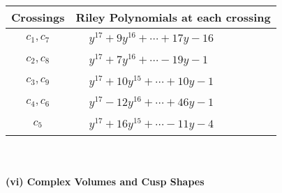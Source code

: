 \documentclass[1p]{elsarticle_modified}
\theoremstyle{definition}
\begin{document}
\begin{tabular}{m{50pt}|m{274pt}}
Crossings & \hspace{64pt}Riley Polynomials at each crossing \\
\hline $$\begin{aligned}c_{1},c_{7}\end{aligned}$$&$\begin{aligned}
&y^{17}+9 y^{16}+\cdots+17 y-16
\end{aligned}$\\
\hline $$\begin{aligned}c_{2},c_{8}\end{aligned}$$&$\begin{aligned}
&y^{17}+7 y^{16}+\cdots-19 y-1
\end{aligned}$\\
\hline $$\begin{aligned}c_{3},c_{9}\end{aligned}$$&$\begin{aligned}
&y^{17}+10 y^{15}+\cdots+10 y-1
\end{aligned}$\\
\hline $$\begin{aligned}c_{4},c_{6}\end{aligned}$$&$\begin{aligned}
&y^{17}-12 y^{16}+\cdots+46 y-1
\end{aligned}$\\
\hline $$\begin{aligned}c_{5}\end{aligned}$$&$\begin{aligned}
&y^{17}+16 y^{15}+\cdots-11 y-4
\end{aligned}$\\
\hline
\end{tabular}\\~\\
\newpage\flushleft \textbf{(vi) Complex Volumes and Cusp Shapes}
\end{document}
